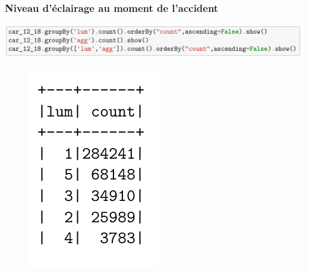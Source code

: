 \documentclass{beamer}
\theoremstyle{definition}
\begin{document}
\begin{frame}
	\frametitle{Niveau d'éclairage au moment de l'accident}

	\begin{minipage}[t]{1\linewidth}
		\includegraphics[width=1\linewidth]{lum0.png}
		\begin{minipage}[t]{0.3\linewidth}\centering\begin{figure}
				\centering
				\includegraphics[width=1\linewidth]{lum1.png}
		\end{figure}\end{minipage}\hfil 

\end{minipage}
\end{frame}
\end{document}
